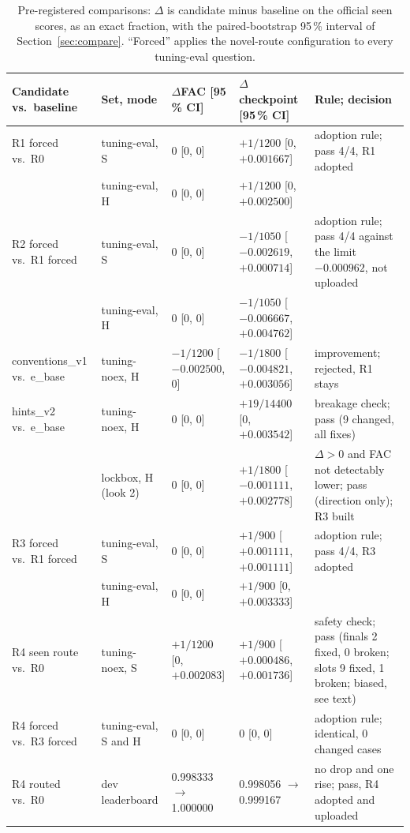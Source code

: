 \documentclass[conference]{IEEEtran}
\begin{document}
\begin{table}[t]
\caption{Pre-registered comparisons: $\Delta$ is candidate minus baseline on the official seen scores, as an exact fraction, with the paired-bootstrap 95\,\% interval of Section~\ref{sec:compare}. ``Forced'' applies the novel-route configuration to every tuning-eval question.}
\label{tab:decisions}
\centering
\scriptsize
\setlength{\tabcolsep}{3pt}
\begin{tabular}{@{}llllp{5.4cm}@{}}
\toprule
Candidate vs.\ baseline & Set, mode & $\Delta$FAC [95\,\% CI] & $\Delta$checkpoint [95\,\% CI] & Rule; decision \\
\midrule
R1 forced vs.\ R0 & tuning-eval, S & 0 [0, 0] & $+1/1200$ [0, $+0.001667$] & adoption rule; pass 4/4, R1 adopted \\
 & tuning-eval, H & 0 [0, 0] & $+1/1200$ [0, $+0.002500$] & \\
R2 forced vs.\ R1 forced & tuning-eval, S & 0 [0, 0] & $-1/1050$ [$-0.002619$, $+0.000714$] & adoption rule; pass 4/4 against the limit $-0.000962$, not uploaded \\
 & tuning-eval, H & 0 [0, 0] & $-1/1050$ [$-0.006667$, $+0.004762$] & \\
conventions\_v1 vs.\ e\_base & tuning-noex, H & $-1/1200$ [$-0.002500$, 0] & $-1/1800$ [$-0.004821$, $+0.003056$] & improvement; rejected, R1 stays \\
hints\_v2 vs.\ e\_base & tuning-noex, H & 0 [0, 0] & $+19/14400$ [0, $+0.003542$] & breakage check; pass (9 changed, all fixes) \\
 & lockbox, H (look 2) & 0 [0, 0] & $+1/1800$ [$-0.001111$, $+0.002778$] & $\Delta>0$ and FAC not detectably lower; pass (direction only); R3 built \\
R3 forced vs.\ R1 forced & tuning-eval, S & 0 [0, 0] & $+1/900$ [$+0.001111$, $+0.001111$] & adoption rule; pass 4/4, R3 adopted \\
 & tuning-eval, H & 0 [0, 0] & $+1/900$ [0, $+0.003333$] & \\
R4 seen route vs.\ R0 & tuning-noex, S & $+1/1200$ [0, $+0.002083$] & $+1/900$ [$+0.000486$, $+0.001736$] & safety check; pass (finals 2 fixed, 0 broken; slots 9 fixed, 1 broken; biased, see text) \\
R4 forced vs.\ R3 forced & tuning-eval, S and H & 0 [0, 0] & 0 [0, 0] & adoption rule; identical, 0 changed cases \\
R4 routed vs.\ R0 & dev leaderboard & 0.998333 $\to$ 1.000000 & 0.998056 $\to$ 0.999167 & no drop and one rise; pass, R4 adopted and uploaded \\
\bottomrule
\end{tabular}
\end{table}
\end{document}
